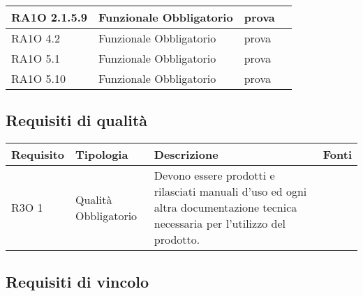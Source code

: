 \begin{center}
\begin{longtable}{ | l | p{2cm} | p{5cm} | p{1.7cm} |}
        RA1O 2.1.5.9 & Funzionale \newline  Obbligatorio  & prova &  \\ \hline      
        RA1O 4.2 & Funzionale \newline  Obbligatorio  & prova &  \\ \hline      
        RA1O 5.1 & Funzionale \newline  Obbligatorio  & prova &  \\ \hline      
        RA1O 5.10 & Funzionale \newline  Obbligatorio  & prova &  \\ \hline
      \end{longtable}
      \egroup
      \end{center}  
\clearpage

\subsection{Requisiti di qualità }

      \begin{center}
      \bgroup
      \def\arraystretch{1.8}
      \begin{longtable}{ | l | p{2cm} | p{5cm} | p{1.7cm} |}
    
      \cellcolor[gray]{0.9} \textbf{Requisito} & \cellcolor[gray]{0.9} \textbf{Tipologia} 
      & \cellcolor[gray]{0.9} \textbf{Descrizione} & \cellcolor[gray]{0.9} \textbf{Fonti} \\ \hline
      
        R3O 1 & Qualità \newline  Obbligatorio  & Devono essere prodotti e rilasciati manuali d'uso ed ogni altra documentazione tecnica necessaria per l’utilizzo del prodotto. &  \\ \hline
      \end{longtable}
      \egroup
      \end{center}  
\clearpage

\subsection{Requisiti di vincolo }

